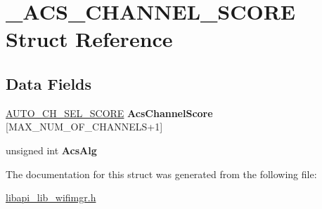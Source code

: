 \hypertarget{struct__ACS__CHANNEL__SCORE}{}\section{\+\_\+\+A\+C\+S\+\_\+\+C\+H\+A\+N\+N\+E\+L\+\_\+\+S\+C\+O\+RE Struct Reference}
\label{struct__ACS__CHANNEL__SCORE}
\subsection*{Data Fields}
\begin{DoxyCompactItemize}
\item 
\mbox{\label{struct__ACS__CHANNEL__SCORE_a91a584f6813279ae52f016161407682b}} 
\hyperlink{struct__AUTO__CH__SEL__SCORE}{A\+U\+T\+O\+\_\+\+C\+H\+\_\+\+S\+E\+L\+\_\+\+S\+C\+O\+RE} {\bfseries Acs\+Channel\+Score} \mbox{[}M\+A\+X\+\_\+\+N\+U\+M\+\_\+\+O\+F\+\_\+\+C\+H\+A\+N\+N\+E\+LS+1\mbox{]}
\item 
\mbox{\label{struct__ACS__CHANNEL__SCORE_ac0c5d9b0975c0128ca14739dfc88c126}} 
unsigned int {\bfseries Acs\+Alg}
\end{DoxyCompactItemize}


The documentation for this struct was generated from the following file\+:\begin{DoxyCompactItemize}
\item 
\hyperlink{libapi__lib__wifimgr_8h}{libapi\+\_\+lib\+\_\+wifimgr.\+h}\end{DoxyCompactItemize}
